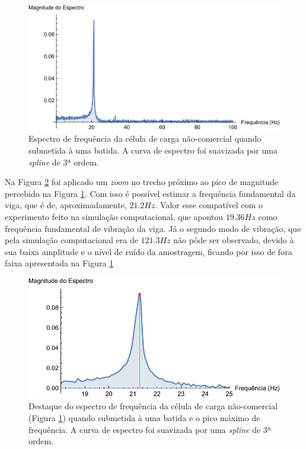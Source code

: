 \documentclass[a4paper]{instrumentacao}
\begin{document}
\begin{figure}[H]
\center
\includegraphics[width=\textwidth]{NaoComercial-Spectrum.pdf}
\caption{Espectro de frequência da célula de carga não-comercial quando submetida à uma batida. A curva de espectro foi suavizada por uma \textit{spline} de 3ª ordem.}
\label{fig:celula-nao-comercial-resultado-espectro}
\end{figure}

Na Figura \ref{fig:celula-nao-comercial-resultado-espectro-destaque} foi aplicado um \textit{zoom} no trecho próximo ao pico de magnitude percebido na Figura \ref{fig:celula-nao-comercial-resultado-espectro}. Com isso é possível estimar a frequência fundamental da viga, que é de, aproximadamente, $21.2Hz$. Valor esse compatível com o experimento feito na simulação computacional, que apontou $19.36Hz$ como frequência fundamental de vibração da viga. Já o segundo modo de vibração, que pela simulação computacional era de $121.3Hz$ não pôde ser observado, devido à sua baixa amplitude e o nível de ruído da amostragem, ficando por isso de fora faixa apresentada na Figura \ref{fig:celula-nao-comercial-resultado-espectro}

\begin{figure}[H]
\center
\includegraphics[width=\textwidth]{NaoComercial-SpectrumHighlight.pdf}
\caption{Destaque do espectro de frequência da célula de carga não-comercial (Figura \ref{fig:celula-nao-comercial-resultado-espectro}) quando submetida à uma batida e o pico máximo de frequência. A curva de espectro foi suavizada por uma \textit{spline} de 3ª ordem.}
\label{fig:celula-nao-comercial-resultado-espectro-destaque}
\end{figure}
\end{document}
